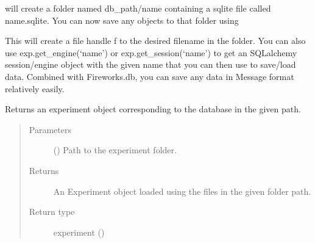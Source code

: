 \documentclass[letterpaper,10pt,english]{sphinxmanual}
\begin{document}
will create a folder named db\_path/name containing a sqlite file called name.sqlite. You can now save any objects to that folder using

%
\begin{sphinxVerbatim}[commandchars=\\\{\}]
   
\end{sphinxVerbatim}

This will create a file handle f to the desired filename in the folder. You can also use exp.get\_engine(‘name’) or exp.get\_session(‘name’)
to get an SQLalchemy session/engine object with the given name that you can then use to save/load data. Combined with Fireworks.db, you can
save any data in Message format relatively easily.

\label{\detokenize{Fireworks:module-Fireworks.extensions.experiment}}

\begin{fulllineitems}
\label{\detokenize{Fireworks:Fireworks.extensions.experiment.load_experiment}}
Returns an experiment object corresponding to the database in the given path.
\begin{quote}\begin{description}
\item[{Parameters}] \leavevmode
{} () \textendash{} Path to the experiment folder.

\item[{Returns}] \leavevmode
An Experiment object loaded using the files in the given folder path.

\item[{Return type}] \leavevmode
experiment ({\hyperref[\detokenize{Fireworks:Fireworks.extensions.experiment.Experiment}]{}})

\end{description}\end{quote}

\end{fulllineitems}
\end{document}
